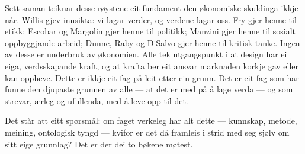 Sett saman teiknar desse røystene eit fundament den økonomiske skuldinga ikkje når. Willis gjev innsikta: vi lagar verder, og verdene lagar oss. Fry gjer henne til etikk; Escobar og Margolin gjer henne til politikk; Manzini gjer henne til sosialt oppbyggjande arbeid; Dunne, Raby og DiSalvo gjer henne til kritisk tanke. Ingen av desse er underbruk av økonomien. Alle tek utgangspunkt i at design har ei eiga, verdsskapande kraft, og at krafta ber eit ansvar marknaden korkje gav eller kan oppheve. Dette er ikkje eit fag på leit etter ein grunn. Det er eit fag som har funne den djupaste grunnen av alle — at det er med på å lage verda — og som strevar, ærleg og ufullenda, med å leve opp til det.

\vignett

Det står att eitt spørsmål: om faget verkeleg har alt dette — kunnskap, metode, meining, ontologisk tyngd — kvifor er det då framleis i strid med seg sjølv om sitt eige grunnlag? Det er der dei to bøkene møtest.


